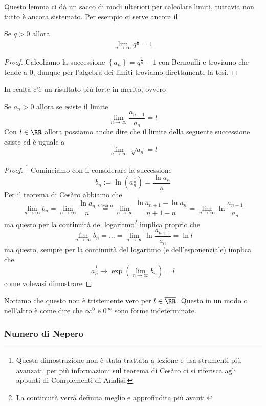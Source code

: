 \documentclass[11pt]{scrartcl}
\begin{document}
	Questo lemma ci dà un sacco di modi ulteriori per calcolare limiti, tuttavia non tutto è ancora sistemato. Per esempio ci serve ancora il
	\begin{lemma}
		Se $q>0$ allora
		$$\lim_{n\to \infty}q^{\frac{1}{n}}=1$$
	\end{lemma}
	\begin{proof}
		Calcoliamo la successione $\left\{a_n\right\}=q^{\frac{1}{n}}-1$ con Bernoulli e troviamo che tende a $0$, dunque per l'algebra dei limiti troviamo direttamente la tesi.
	\end{proof}
	In realtà c'è un risultato più forte in merito, ovvero
	\begin{lemma}\label{criterio della radice per le successioni}
		Se $a_n>0$ allora se esiste il limite
		$$\lim_{n\to\infty}\frac{a_{n+1}}{a_n}=l$$
		Con $l\in\RR$ allora possiamo anche dire che il limite della seguente successione esiste ed è uguale a
		$$\lim_{n\to\infty}\sqrt[n]{a_n}=l$$
	\end{lemma}
	\begin{proof}
		\footnote{Questa dimostrazione non è stata trattata a lezione e usa strumenti più avanzati, per più informazioni sul teorema di Cesàro ci si riferisca agli appunti di Complementi di Analisi.} Cominciamo con il considerare la successione
		$$b_n:=\ln\left(a_n^{\frac{1}{n}}\right)=\frac{\ln a_n}{n}$$
		Per il teorema di Cesàro abbiamo che 
		$$\lim_{n\to\infty}b_n=\lim_{n\to \infty}\frac{\ln a_n}{n}\overset{\text{Cesàro}}{=}\lim_{n\to\infty}\frac{\ln a_{n+1}-\ln a_n}{n+1-n}=\lim_{n\to \infty}\ln\frac{a_{n+1}}{a_n}$$
		ma questo per la continuità del logaritmo\footnote{La continuità verrà definita meglio e approfindita più avanti.} implica proprio che
		$$\lim_{n\to\infty}b_n=\dots = \lim_{n\to \infty}\ln\frac{a_{n+1}}{a_n}=\ln l$$
		ma questo, sempre per la continuità del logaritmo (e dell'esponenziale) implica che 
		$$a_n^{\frac{1}{n}} \to \exp\left(\lim_{n\to\infty}b_n\right)=l$$
		come volevasi dimostrare
	\end{proof}
	Notiamo che questo non è tristemente vero per $l\in\overline{\RR}$. Questo in un modo o nell'altro è come dire che $\infty^0$ e $0^\infty$ sono forme indeterminate.
	\subsubsection{Numero di Nepero}
	
\end{document}

